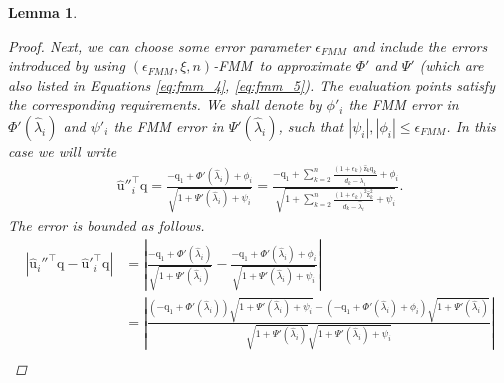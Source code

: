 \documentclass{article}
\newcommand{\labs}{\left|}
\newcommand{\rabs}{\right|}
\newcommand{\lpar}{\left(}
\newcommand{\rpar}{\right)}
\newtheorem{lemma}{Lemma}[section]
\newcommand\vecq{\boldsymbol{\mathrm{q}}}
\newcommand\vecuhat{\widehat{\boldsymbol{\mathrm{u}}}}
\newcommand\veczhat{\widehat{\boldsymbol{\mathrm{z}}}}
\newcommand{\cfmm}{\xi}
\newcommand{\fmmalgo}{FMM} \usepackage[utf8]{inputenc}
\begin{document}
\begin{lemma}
\begin{proof}
        Next, we can choose some error parameter $\epsilon_{FMM}$ and include the errors introduced by using $(\epsilon_{FMM},\cfmm,n)$-\fmmalgo\   to approximate $\Phi'$ and $\Psi'$ (which are also listed in Equations \eqref{eq:fmm_4}, \eqref{eq:fmm_5}). The evaluation points satisfy the corresponding requirements.
        We shall denote by $\phi'_i$ the FMM error in $\Phi'(\widehat\lambda_i)$ and
        $\psi'_i$ the FMM error in $\Psi'(\widehat\lambda_i)$, such that $|\psi_i|,|\phi_i|\leq \epsilon_{FMM}$. In this case we will write
        \begin{align*}
            \vecuhat''^\top_i\vecq = 
            \frac{
                -\vecq_1+\Phi'(\widehat\lambda_i)+\phi_i
            }{
                \sqrt{1+\Psi'(\widehat\lambda_i)+\psi_i}
            }
            =
            \frac{
                -\vecq_1
                +
                \sum_{k=2}^n\frac{(1+\epsilon_k)\veczhat_k\vecq_k}{d_k-\widehat\lambda_i}
                +
                \phi_i
            }{
                \sqrt{1
                +
                \sum_{k=2}^n
                \frac{(1+\epsilon_k)^2\veczhat^2_k}{d_k-\widehat\lambda_i}
                +
                \psi_i}
            }.
        \end{align*}
        The error is bounded as follows.
        \begingroup
        \allowdisplaybreaks
        \begin{align}
            \labs \vecuhat_i''^\top \vecq - \vecuhat'^\top_i\vecq \rabs
            &=
            \labs
                \frac{
                -\vecq_1+\Phi'(\widehat\lambda_i)
                }{
                    \sqrt{1+\Psi'(\widehat\lambda_i)}
                }
                -
                \frac{
                -\vecq_1+\Phi'(\widehat\lambda_i)+\phi_i
                }{
                    \sqrt{1+\Psi'(\widehat\lambda_i)+\psi_i}
                }
            \rabs
            \nonumber
            \\
            &=
            \labs
                \frac{
                \lpar
                    -\vecq_1+\Phi'(\widehat\lambda_i)
                \rpar
                \sqrt{1+\Psi'(\widehat\lambda_i)+\psi_i}
                -
                \lpar
                    -\vecq_1+\Phi'(\widehat\lambda_i)+\phi_i
                \rpar
                \sqrt{1+\Psi'(\widehat\lambda_i)}
                }{
                    \sqrt{1+\Psi'(\widehat\lambda_i)}\sqrt{1+\Psi'(\widehat\lambda_i)+\psi_i}
                }
            \rabs
            \nonumber
            \\

\end{align}
\end{proof}
\end{lemma}
\end{document}
